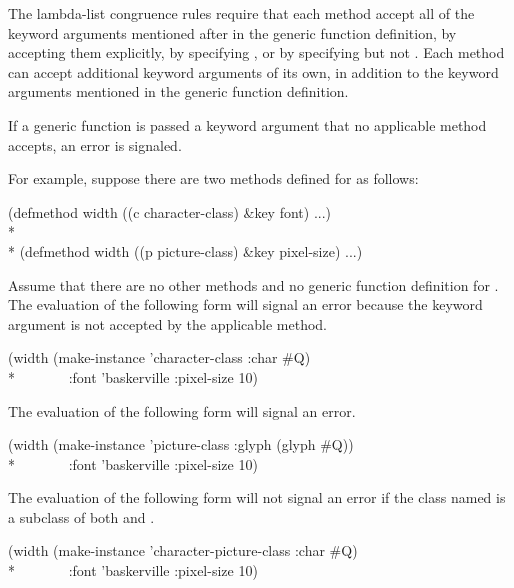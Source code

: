 The lambda-list congruence rules require that each method
accept all of the keyword arguments mentioned after  in the
generic function definition, by accepting them explicitly, by
specifying , or by specifying  but
not .  Each method can accept additional keyword arguments
of its own, in addition to the keyword arguments mentioned in the
generic function definition.


If a generic function is passed a keyword argument that no applicable
method accepts, an error is signaled.

For example, suppose there are two methods defined for 
as follows:

\begin{lisp}
(defmethod width ((c character-class) \&key font) ...)\\*
\\*
(defmethod width ((p picture-class) \&key pixel-size) ...)
\end{lisp}

\noindent Assume that there are no other methods and no generic
function definition for . The evaluation of the
following form will signal an error because the keyword argument
 is not accepted by the applicable method.

\begin{lisp}
(width (make-instance 'character-class :char \#{\Xbackslash}Q) \\*
~~~~~~~:font 'baskerville :pixel-size 10)
\end{lisp}

The evaluation of the following form will signal an error.

\begin{lisp}
(width (make-instance 'picture-class :glyph (glyph \#{\Xbackslash}Q)) \\*
~~~~~~~:font 'baskerville :pixel-size 10)
\end{lisp}

The evaluation of the following form will not signal an error
if the class named  is a subclass of
both  and .

\begin{lisp}
(width (make-instance 'character-picture-class :char \#{\Xbackslash}Q) \\*
~~~~~~~:font 'baskerville :pixel-size 10)
\end{lisp}


